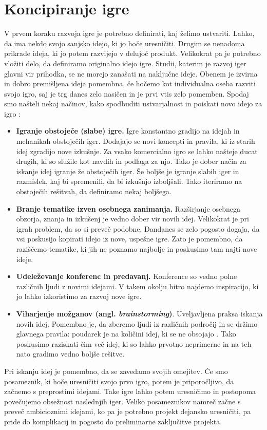 \documentclass[12pt,a4paper,twoside]{book}
\begin{document}
\section{Koncipiranje igre}
V prvem koraku razvoja igre je potrebno definirati, kaj želimo ustvariti. Lahko, da ima nekdo svojo sanjsko idejo, ki jo hoče uresničiti. Drugim se nenadoma prikrade ideja, ki jo potem razvijejo v delujoč produkt. Velikokrat pa je potrebno vložiti delo, da definiramo originalno idejo igre. Studii, katerim je razvoj iger glavni vir prihodka, se ne morejo zanašati na naključne ideje. Obenem je izvirna in dobro premišljena ideja pomembna, če hočemo kot individualna oseba razviti svojo igro, saj je trg danes zelo nasičen in je prvi vtis zelo pomemben. Spodaj smo našteli nekaj načinov, kako spodbuditi ustvarjalnost in poiskati novo idejo za igro \cite{rogers2014level}: 
\begin{itemize}
	\item \textbf{Igranje obstoječe (slabe) igre.} Igre konstantno gradijo na idejah in mehanikah obstoječih iger. Dodajajo se novi koncepti in pravila, ki iz starih idej zgradijo nove izkušnje. Za vsako komercialno igro se lahko našteje ducat drugih, ki so služile kot navdih in podlaga za njo. Tako je dober način za iskanje idej igranje že obstoječih iger. Še boljše je igranje slabih iger in razmislek, kaj bi spremenili, da bi izkušnjo izboljšali. Tako iteriramo na obstoječih rešitvah, da definiramo nekaj boljšega.
	\item \textbf{Branje tematike izven osebnega zanimanja.} Razširjanje osebnega obzorja, znanja in izkušenj je vedno dober vir novih idej. Velikokrat je pri igrah problem, da so si preveč podobne. Dandanes se zelo pogosto dogaja, da vsi poskusijo kopirati idejo iz nove, uspešne igre. Zato je pomembno, da raziščemo tematike, ki jih ne poznamo najbolje in poskusimo tam najti nove ideje.
	\item \textbf{Udeleževanje konferenc in predavanj.} Konference so vedno polne različnih ljudi z novimi idejami. V takem okolju hitro najdemo inspiracijo, ki jo lahko izkoristimo za razvoj nove igre.
	\item \textbf{Viharjenje možganov (angl. \textit{brainstorming})}. Uveljavljena praksa iskanja novih idej. Pomembno je, da zberemo ljudi iz različnih področij in se držimo glavnega pravila: poudarek je na količini idej, ki se ne obsojajo \cite{osborn1953applied}. Tako poskusimo raziskati čim več idej, ki so lahko prvotno neprimerne in na teh nato gradimo vedno boljše rešitve.
\end{itemize}
Pri iskanju idej je pomembno, da se zavedamo svojih omejitev. Če smo posameznik, ki hoče uresničiti svojo prvo igro, potem je priporočljivo, da začnemo s preprostimi idejami. Take igre lahko potem uresničimo in postopoma povečujemo obsežnost naslednjih iger. Veliko posameznikov namreč začne s preveč ambicioznimi idejami, ko pa je potrebno projekt dejansko uresničiti, pa pride do komplikacij in pogosto do preliminarne zaključitve projekta.
\end{document}
